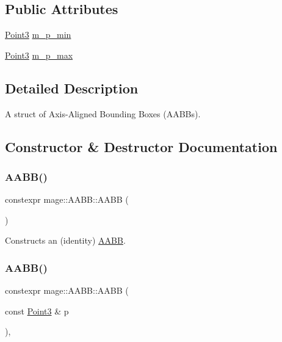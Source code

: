 \subsection*{Public Attributes}
\begin{DoxyCompactItemize}
\item 
\hyperlink{structmage_1_1_point3}{Point3} \hyperlink{structmage_1_1_a_a_b_b_af5b7608aa0e332d70edfe0cb77bd27c2}{m\+\_\+p\+\_\+min}
\item 
\hyperlink{structmage_1_1_point3}{Point3} \hyperlink{structmage_1_1_a_a_b_b_a51643192d891301df8d8d3f24abd2a27}{m\+\_\+p\+\_\+max}
\end{DoxyCompactItemize}


\subsection{Detailed Description}
A struct of Axis-\/\+Aligned Bounding Boxes (A\+A\+B\+Bs). 

\subsection{Constructor \& Destructor Documentation}
\hypertarget{structmage_1_1_a_a_b_b_ac9b2292e07c85e8d4f3bd8fef7555175}{}\label{structmage_1_1_a_a_b_b_ac9b2292e07c85e8d4f3bd8fef7555175} 
\subsubsection{\texorpdfstring{A\+A\+B\+B()}{AABB()}\hspace{0.1cm}{\footnotesize\ttfamily [1/6]}}
{\footnotesize\ttfamily constexpr mage\+::\+A\+A\+B\+B\+::\+A\+A\+BB (\begin{DoxyParamCaption}{ }\end{DoxyParamCaption})\hspace{0.3cm}{\ttfamily [noexcept]}}

Constructs an (identity) \hyperlink{structmage_1_1_a_a_b_b}{A\+A\+BB}. \hypertarget{structmage_1_1_a_a_b_b_acbe5617aeeac1137081aeb5543ed6725}{}\label{structmage_1_1_a_a_b_b_acbe5617aeeac1137081aeb5543ed6725} 
\subsubsection{\texorpdfstring{A\+A\+B\+B()}{AABB()}\hspace{0.1cm}{\footnotesize\ttfamily [2/6]}}
{\footnotesize\ttfamily constexpr mage\+::\+A\+A\+B\+B\+::\+A\+A\+BB (\begin{DoxyParamCaption}\item[{const \hyperlink{structmage_1_1_point3}{Point3} \&}]{p }\end{DoxyParamCaption})\hspace{0.3cm}{\ttfamily [explicit]}, {\ttfamily [noexcept]}}

